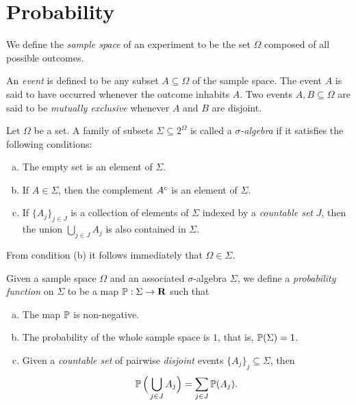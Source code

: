 \section{Probability}

\begin{definition}
\label{def:sample-space}
We define the \emph{sample space} of an experiment to be the set \(\Omega\)
composed of all possible outcomes.

An \emph{event} is defined to be any subset \(A \subseteq \Omega\) of the sample
space. The event \(A\) is said to have occurred whenever the outcome inhabits
\(A\). Two events \(A, B \subseteq \Omega\) are said to be \emph{mutually
  exclusive} whenever \(A\) and \(B\) are disjoint.
\end{definition}

\begin{definition}
\label{def:sigma-algebra}
Let \(\Omega\) be a set. A family of subsets \(\Sigma \subseteq 2^{\Omega}\) is called
a \emph{\(\sigma\)-algebra} if it satisfies the following conditions:
\begin{enumerate}[(a)]\setlength\itemsep{0em}
\item The empty set is an element of \(\Sigma\).
\item If \(A \in \Sigma\), then the complement \({A}^{\text{c}}\) is an
  element of \(\Sigma\).
\item If \(\{A_j\}_{j \in J}\) is a collection of elements of \(\Sigma\)
  indexed by a \emph{countable set} \(J\), then the union
  \(\bigcup_{j \in J} A_j\) is also contained in \(\Sigma\).
\end{enumerate}
From condition (b) it follows immediately that \(\Omega \in \Sigma\).
\end{definition}

\begin{definition}
\label{def:probability-function}
Given a sample space \(\Omega\) and an associated \(\sigma\)-algebra \(\Sigma\),
we define a \emph{probability function} on \(\Sigma\) to be a map
\(\operatorname{\mathbb{P}}: \Sigma \to \mathbf{R}\) such that
\begin{enumerate}[(a)]\setlength\itemsep{0em}
\item The map \(\operatorname{\mathbb{P}}\) is non-negative.
\item The probability of the whole sample space is \(1\), that is,
  \(\operatorname{\mathbb{P}}(\Sigma) = 1\).
\item Given a \emph{countable set} of pairwise \emph{disjoint} events
  \(\{A_j\}_{j} \subseteq \Sigma\), then
  \[
  \operatorname{\mathbb{P}}\Big( \bigcup_{j \in J} A_j \Big) = \sum_{j \in J} \operatorname{\mathbb{P}}(A_j).
  \]
\end{enumerate}
\end{definition}

